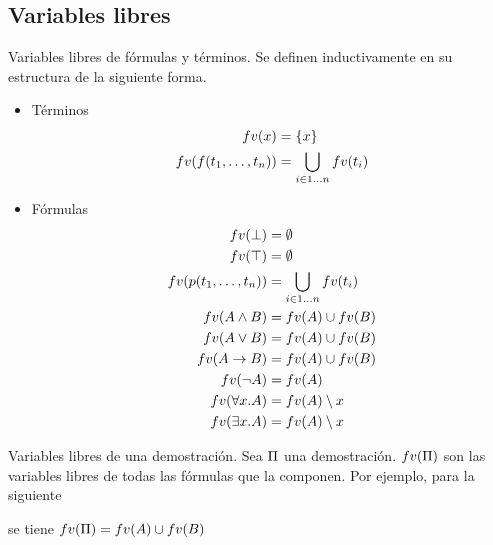 \subsection{Variables libres}


\begin{definition}{Variables libres de fórmulas y términos}. Se definen inductivamente en su estructura de la siguiente forma.

    \begin{itemize}
        \item Términos
        \begin{align*}
            fv(x) &= \{ x \}\\
            fv(f(t_1, \dots, t_n)) &= \bigcup_{i \in 1\dots n} fv(t_i) 
        \end{align*}
    
        \item Fórmulas
        \begin{align*}
            fv(\bot) &=\emptyset\\
            fv(\top) &=\emptyset \\
            fv(p(t_1, \dots, t_n)) &= \bigcup_{i \in 1\dots n} fv(t_i) \\
            fv(A \wedge B) &= fv(A) \cup fv(B)\\
            fv(A \vee B) &=fv(A) \cup fv(B)\\
            fv(A \to B) &=fv(A) \cup fv(B)\\
            fv(\neg A) &=fv(A)\\
            fv(\forall x . A) &= fv(A) \setminus x \\
            fv(\exists x . A) &= fv(A) \setminus x
        \end{align*}

    \end{itemize}
\end{definition}

\begin{definition}{Variables libres de una demostración.} Sea $\Pi$ una demostración. $fv(\Pi)$ son las variables libres de todas las fórmulas que la componen. Por ejemplo, para la siguiente

    \proofTreeAndI

    se tiene $fv(\Pi) = fv(A) \cup fv(B)$
    
\end{definition}
